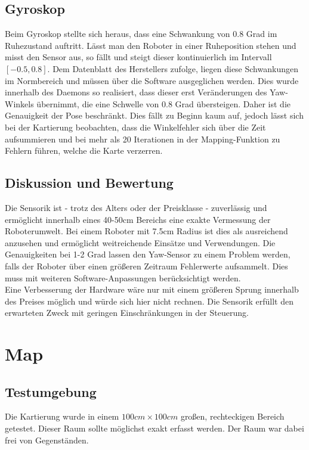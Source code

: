 \documentclass[twoside,11pt, a4paper]{report}
\begin{document}
	\subsection{Gyroskop}
	Beim Gyroskop stellte sich heraus, dass eine Schwankung von 0.8 Grad im Ruhezustand auftritt. Lässt man den Roboter in einer Ruheposition stehen und misst den Sensor aus, so fällt und steigt dieser kontinuierlich im Intervall $[-0.5, 0.8]$. Dem Datenblatt des Herstellers zufolge, liegen diese Schwankungen im Normbereich und müssen über die Software ausgeglichen werden. Dies wurde innerhalb des Daemons so realisiert, dass dieser erst Veränderungen des Yaw-Winkels übernimmt, die eine Schwelle von 0.8 Grad übersteigen. Daher ist die Genauigkeit der Pose beschränkt. Dies fällt zu Beginn kaum auf, jedoch lässt sich bei der Kartierung beobachten, dass die Winkelfehler sich über die Zeit aufsummieren und bei mehr als 20 Iterationen in der Mapping-Funktion zu Fehlern führen, welche die Karte verzerren. \\
	
	\subsection{Diskussion und Bewertung}
	Die Sensorik ist - trotz des Alters oder der Preisklasse - zuverlässig und ermöglicht innerhalb eines 40-50cm Bereichs eine exakte Vermessung der Roboterumwelt. Bei einem Roboter mit 7.5cm Radius ist dies als ausreichend anzusehen und ermöglicht weitreichende Einsätze und Verwendungen. Die Genauigkeiten bei 1-2 Grad lassen den Yaw-Sensor zu einem Problem werden, falls der Roboter über einen größeren Zeitraum Fehlerwerte aufsammelt. Dies muss mit weiteren Software-Anpassungen berücksichtigt werden. \\
	Eine Verbesserung der Hardware wäre nur mit einem größeren Sprung innerhalb des Preises möglich und würde sich hier nicht rechnen. Die Sensorik erfüllt den erwarteten Zweck mit geringen Einschränkungen in der Steuerung. 
	
	\section{Map}
	\subsection{Testumgebung}
	Die Kartierung wurde in einem $100cm \times 100cm$ großen, rechteckigen Bereich getestet. Dieser Raum sollte möglichst exakt erfasst werden. Der Raum war dabei frei von Gegenständen. 
	
\end{document}
